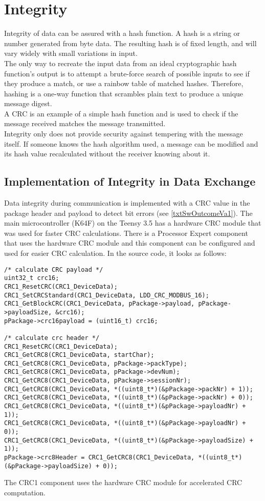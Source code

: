 \section{Integrity}
Integrity of data can be assured with a hash function. A hash is a string or number generated from byte data. The resulting hash is of fixed length, and will vary widely with small variations in input.\\
The only way to recreate the input data from an ideal cryptographic hash function's output is to attempt a brute-force search of possible inputs to see if they produce a match, or use a rainbow table of matched hashes. Therefore, hashing is a one-way function that scrambles plain text to produce a unique message digest.\\
A CRC is an example of a simple hash function and is used to check if the message received matches the message transmitted.\\
Integrity only does not provide security against tempering with the message itself. If someone knows the hash algorithm used, a message can be modified and its hash value recalculated without the receiver knowing about it.
%
\subsection{Implementation of Integrity in Data Exchange}
Data integrity during communication is implemented with a CRC value in the package header and payload to detect bit errors (see \autoref{txtSwOutcomeVa1}). The main microcontroller (K64F) on the Teensy 3.5 has a hardware CRC module that was used for faster CRC calculations. There is a Processor Expert component that uses the hardware CRC module and this component can be configured and used for easier CRC calculation. In the source code, it looks as follows:
\begin{lstlisting}
/* calculate CRC payload */
uint32_t crc16;
CRC1_ResetCRC(CRC1_DeviceData);
CRC1_SetCRCStandard(CRC1_DeviceData, LDD_CRC_MODBUS_16);
CRC1_GetBlockCRC(CRC1_DeviceData, pPackage->payload, pPackage->payloadSize, &crc16);
pPackage->crc16payload = (uint16_t) crc16;

/* calculate crc header */
CRC1_ResetCRC(CRC1_DeviceData);
CRC1_GetCRC8(CRC1_DeviceData, startChar);
CRC1_GetCRC8(CRC1_DeviceData, pPackage->packType);
CRC1_GetCRC8(CRC1_DeviceData, pPackage->devNum);
CRC1_GetCRC8(CRC1_DeviceData, pPackage->sessionNr);
CRC1_GetCRC8(CRC1_DeviceData, *((uint8_t*)(&pPackage->packNr) + 1));
CRC1_GetCRC8(CRC1_DeviceData, *((uint8_t*)(&pPackage->packNr) + 0));
CRC1_GetCRC8(CRC1_DeviceData, *((uint8_t*)(&pPackage->payloadNr) + 1));
CRC1_GetCRC8(CRC1_DeviceData, *((uint8_t*)(&pPackage->payloadNr) + 0));
CRC1_GetCRC8(CRC1_DeviceData, *((uint8_t*)(&pPackage->payloadSize) + 1));
pPackage->crc8Header = CRC1_GetCRC8(CRC1_DeviceData, *((uint8_t*)(&pPackage->payloadSize) + 0));
\end{lstlisting}
The CRC1 component uses the hardware CRC module for accelerated CRC computation.
%
